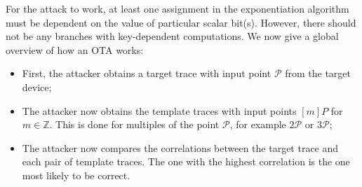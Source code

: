 %
For the attack to work, at least one assignment in the exponentiation algorithm must be dependent on the value of particular scalar bit(s). 
However, there should not be any branches with key-dependent computations.
We now give a global overview of how an OTA works:
%
\begin{itemize}
	\item First, the attacker obtains a target trace with input point $\mathcal{P}$ from the target device;
	\item The attacker now obtains the template traces with input points $[m]P$ for $m \in \mathbb{Z}$.
	 This is done for multiples of the point $\mathcal{P}$, for example $2\mathcal{P}$ or $3\mathcal{P}$;
	 \item The attacker now compares the correlations between the target trace and each pair of template traces.
	 The one with the highest correlation is the one most likely to be correct.
\end{itemize}
%

